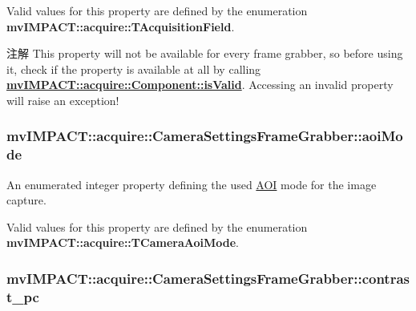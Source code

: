 Valid values for this property are defined by the enumeration {\bfseries mv\+I\+M\+P\+A\+C\+T\+::acquire\+::\+T\+Acquisition\+Field}.

\begin{DoxyNote}{注解}
This property will not be available for every frame grabber, so before using it, check if the property is available at all by calling {\bfseries \hyperlink{classmv_i_m_p_a_c_t_1_1acquire_1_1_component_ac51e55e7e046101f3c6119d84123abd5}{mv\+I\+M\+P\+A\+C\+T\+::acquire\+::\+Component\+::is\+Valid}}. Accessing an invalid property will raise an exception! 
\end{DoxyNote}
\hypertarget{classmv_i_m_p_a_c_t_1_1acquire_1_1_camera_settings_frame_grabber_a7832a8f28a3896b5aeda151c30cefe1a}{
\subsubsection[{aoi\+Mode}]{ mv\+I\+M\+P\+A\+C\+T\+::acquire\+::\+Camera\+Settings\+Frame\+Grabber\+::aoi\+Mode}}\label{classmv_i_m_p_a_c_t_1_1acquire_1_1_camera_settings_frame_grabber_a7832a8f28a3896b5aeda151c30cefe1a}


An enumerated integer property defining the used \hyperlink{struct_a_o_i}{A\+O\+I} mode for the image capture. 

Valid values for this property are defined by the enumeration {\bfseries mv\+I\+M\+P\+A\+C\+T\+::acquire\+::\+T\+Camera\+Aoi\+Mode}. \hypertarget{classmv_i_m_p_a_c_t_1_1acquire_1_1_camera_settings_frame_grabber_ab7ab2179bcc174da9b31af1293842e49}{
\subsubsection[{contrast\+\_\+pc}]{ mv\+I\+M\+P\+A\+C\+T\+::acquire\+::\+Camera\+Settings\+Frame\+Grabber\+::contrast\+\_\+pc}}\label{classmv_i_m_p_a_c_t_1_1acquire_1_1_camera_settings_frame_grabber_ab7ab2179bcc174da9b31af1293842e49}


